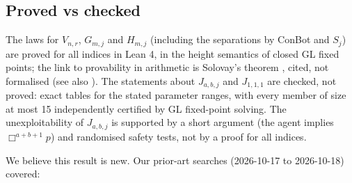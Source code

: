 \documentclass{article}
\begin{document}
\subsection*{Proved vs checked}

The laws for $V_{n,r}$, $G_{m,j}$ and $H_{m,j}$ (including the separations by ConBot and $S_j$)
are proved for all indices in Lean 4, in the height semantics of closed GL fixed points; the link
to provability in arithmetic is Solovay's theorem \cite{solovay1976provability}, cited, not
formalised (see also \cite{boolos1993logic}). The statements about $J_{a,b,j}$ and $J_{1,1,1}$ are
checked, not proved: exact tables for the stated parameter ranges, with every member of size at
most 15 independently certified by GL fixed-point solving. The unexploitability of $J_{a,b,j}$ is
supported by a short argument (the agent implies $\Box^{a+b+1}p$) and randomised safety tests,
not by a proof for all indices.

We believe this result is new. Our prior-art searches (2026-10-17 to 2026-10-18) covered:
\end{document}
